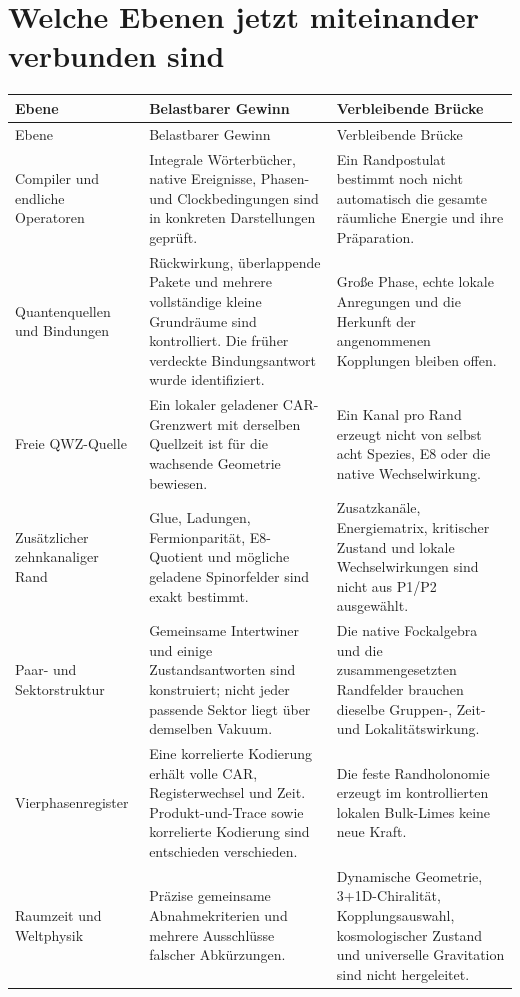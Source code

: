 \documentclass[11pt,a4paper,oneside,parskip=half,headings=normal,numbers=noenddot,bibliography=totoc]{scrreprt}
\begin{document}
\section{Welche Ebenen jetzt miteinander verbunden sind}
\begin{longtable}{@{}P{.22\textwidth}P{.34\textwidth}P{.36\textwidth}@{}}
\toprule Ebene & Belastbarer Gewinn & Verbleibende Brücke\\\midrule\endfirsthead
\toprule Ebene & Belastbarer Gewinn & Verbleibende Brücke\\\midrule\endhead
Compiler und endliche Operatoren & Integrale Wörterbücher, native Ereignisse, Phasen- und Clockbedingungen sind in konkreten Darstellungen geprüft. & Ein Randpostulat bestimmt noch nicht automatisch die gesamte räumliche Energie und ihre Präparation.\\
Quantenquellen und Bindungen & Rückwirkung, überlappende Pakete und mehrere vollständige kleine Grundräume sind kontrolliert. Die früher verdeckte Bindungsantwort wurde identifiziert. & Große Phase, echte lokale Anregungen und die Herkunft der angenommenen Kopplungen bleiben offen.\\
Freie QWZ-Quelle & Ein lokaler geladener CAR-Grenzwert mit derselben Quellzeit ist für die wachsende Geometrie bewiesen. & Ein Kanal pro Rand erzeugt nicht von selbst acht Spezies, E8 oder die native Wechselwirkung.\\
Zusätzlicher zehnkanaliger Rand & Glue, Ladungen, Fermionparität, E8-Quotient und mögliche geladene Spinorfelder sind exakt bestimmt. & Zusatzkanäle, Energiematrix, kritischer Zustand und lokale Wechselwirkungen sind nicht aus P1/P2 ausgewählt.\\
Paar- und Sektorstruktur & Gemeinsame Intertwiner und einige Zustandsantworten sind konstruiert; nicht jeder passende Sektor liegt über demselben Vakuum. & Die native Fockalgebra und die zusammengesetzten Randfelder brauchen dieselbe Gruppen-, Zeit- und Lokalitätswirkung.\\
Vierphasenregister & Eine korrelierte Kodierung erhält volle CAR, Registerwechsel und Zeit. Produkt-und-Trace sowie korrelierte Kodierung sind entschieden verschieden. & Die feste Randholonomie erzeugt im kontrollierten lokalen Bulk-Limes keine neue Kraft.\\
Raumzeit und Weltphysik & Präzise gemeinsame Abnahmekriterien und mehrere Ausschlüsse falscher Abkürzungen. & Dynamische Geometrie, 3+1D-Chiralität, Kopplungsauswahl, kosmologischer Zustand und universelle Gravitation sind nicht hergeleitet.\\\bottomrule
\end{longtable}
\end{document}
